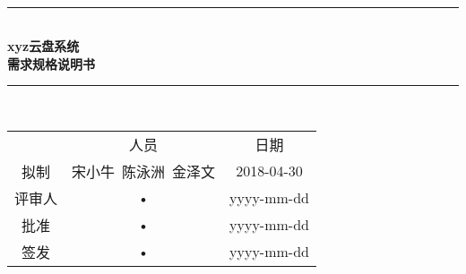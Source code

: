 \documentclass[bachelor]{ustcthesis}
\newcommand{\docname}{xyz云盘系统}
\newcommand{\HRule}{\rule{\linewidth}{0.5mm}}
\begin{document}
\begin{titlepage}
\begin{center}
~\\[5cm]
\HRule \\[0.4cm]
{\huge \bfseries \docname\\需求规格说明书}\\[0.4cm]
\HRule \\[1.5cm]

\begin{tabular}{ccc}
  & 人员 & 日期 \\ 
拟制 & 宋小牛\ 陈泳洲\ 金泽文 & 2018-04-30 \\ 
评审人 & • & yyyy-mm-dd \\ 
批准 & • & yyyy-mm-dd \\ 
签发 & • & yyyy-mm-dd \\ 
\end{tabular} 

\end{center}
\end{titlepage}



\frontmatter

\tableofcontents
\listoffigures
\listoftables
% 
\mainmatter









% 


\appendix


\end{document}

